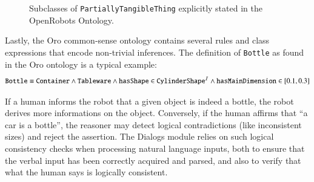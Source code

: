 \documentclass[preprint,3p,times]{elsarticle}
\newcommand{\concept}[1]{{\small \texttt{#1}}}
\begin{document}
\begin{figure}
    \centering

    \caption{Subclasses of \concept{PartiallyTangibleThing} explicitly stated in the
    OpenRobots Ontology.}
    \label{fig|tangible_things_tbox}
\end{figure}

Lastly, the {\sc Oro} common-sense ontology contains several rules and class
expressions that encode non-trivial inferences. The definition of
\concept{Bottle} as found in the {\sc Oro} ontology is a typical example:
$$
\text{\tt Bottle} \equiv \text{\tt Container} \wedge 
                         \text{\tt Tableware} \wedge
                         \text{\tt hasShape} \in \text{\tt CylinderShape}^{\mathcal{I}} \wedge
                         \text{\tt hasMainDimension} \in [0.1, 0.3]
$$

If a human informs the robot that a given object is indeed a bottle, the robot
derives more informations on the object. Conversely, if the human affirms that
``a car is a bottle'', the reasoner may detect logical contradictions (like
inconsistent sizes) and reject the assertion. The {\sc Dialogs} module relies on
such logical consistency checks when processing natural language inputs, both to
ensure that the verbal input has been correctly acquired and parsed, and also to
verify that what the human says is logically consistent.
\end{document}

